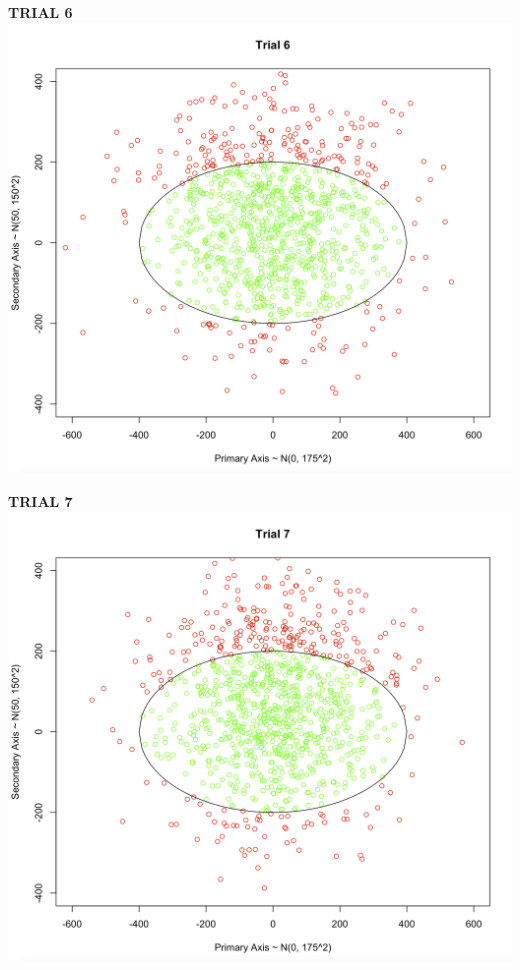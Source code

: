 \documentclass[svgnames]{article}
\begin{document}
\textbf{TRIAL 6}
\newline
\includegraphics[scale=.35]{trial6}

\textbf{TRIAL 7}
\newline
\includegraphics[scale=.35]{trial7}
\end{document}
